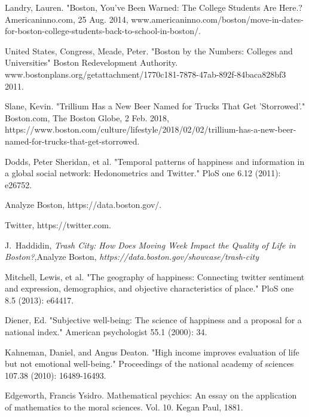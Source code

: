 \documentclass[journal, a4paper]{IEEEtran}
\begin{document}
\begin{thebibliography}{5}

    Landry, Lauren. "Boston, You've Been Warned: The College Students Are Here.? Americaninno.com, 25 Aug. 2014, www.americaninno.com/boston/move-in-dates-for-boston-college-students-back-to-school-in-boston/.
    
    United States, Congress, Meade, Peter. "Boston by the Numbers: Colleges and Universities" Boston Redevelopment Authority. www.bostonplans.org/getattachment/1770c181-7878-47ab-892f-84baca828bf3 2011.
    
    Slane, Kevin. "Trillium Has a New Beer Named for Trucks That Get 'Storrowed'." Boston.com, The Boston Globe, 2 Feb. 2018, https://www.boston.com/culture/lifestyle/2018/02/02/trillium-has-a-new-beer-named-for-trucks-that-get-storrowed.
    
    Dodds, Peter Sheridan, et al. "Temporal patterns of happiness and information in a global social network: Hedonometrics and Twitter." PloS one 6.12 (2011): e26752.
    
    Analyze Boston, https://data.boston.gov/.

   Twitter, https://twitter.com.
   
   J.~Haddidin,  \emph{Trash City: How Does Moving Week Impact the Quality of Life in Boston?},\relax Analyze Boston,  \emph{https://data.boston.gov/showcase/trash-city}
   
   Mitchell, Lewis, et al. "The geography of happiness: Connecting twitter sentiment and expression, demographics, and objective characteristics of place." PloS one 8.5 (2013): e64417.
   
   Diener, Ed. "Subjective well-being: The science of happiness and a proposal for a national index." American psychologist 55.1 (2000): 34.
   
   Kahneman, Daniel, and Angus Deaton. "High income improves evaluation of life but not emotional well-being." Proceedings of the national academy of sciences 107.38 (2010): 16489-16493.
   
   Edgeworth, Francis Ysidro. Mathematical psychics: An essay on the application of mathematics to the moral sciences. Vol. 10. Kegan Paul, 1881.
   

\end{thebibliography}
\end{document}
